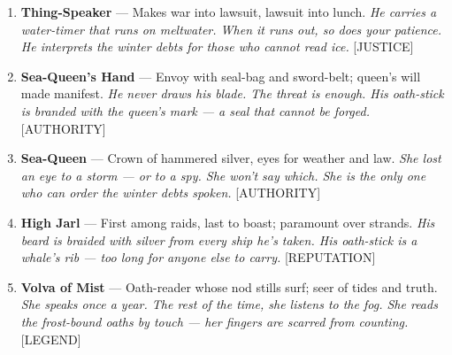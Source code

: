 \begin{enumerate}
\item \textbf{Thing-Speaker} --- Makes war into lawsuit, lawsuit into lunch.
  \hfill \textit{He carries a water-timer that runs on meltwater. When it runs out, so does your patience. He interprets the winter debts for those who cannot read ice.} [JUSTICE]
\item[J] \textbf{Sea-Queen's Hand} --- Envoy with seal-bag and sword-belt; queen's will made manifest.
  \hfill \textit{He never draws his blade. The threat is enough. His oath-stick is branded with the queen's mark --- a seal that cannot be forged.} [AUTHORITY]
\item[Q] \textbf{Sea-Queen} --- Crown of hammered silver, eyes for weather and law.
  \hfill \textit{She lost an eye to a storm --- or to a spy. She won't say which. She is the only one who can order the winter debts spoken.} [AUTHORITY]
\item[K] \textbf{High Jarl} --- First among raids, last to boast; paramount over strands.
  \hfill \textit{His beard is braided with silver from every ship he's taken. His oath-stick is a whale's rib --- too long for anyone else to carry.} [REPUTATION]
\item[A] \textbf{Volva of Mist} --- Oath-reader whose nod stills surf; seer of tides and truth.
  \hfill \textit{She speaks once a year. The rest of the time, she listens to the fog. She reads the frost-bound oaths by touch --- her fingers are scarred from counting.} [LEGEND]
\end{enumerate}

